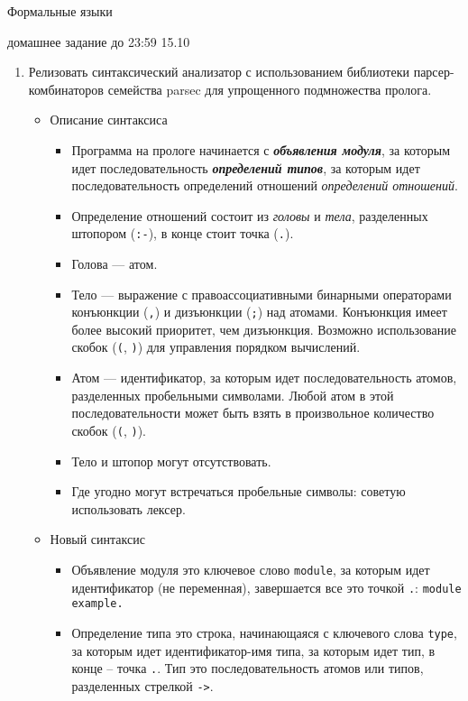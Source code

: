 \documentclass[12pt]{article}
\begin{document}
\begin{center} {\LARGE Формальные языки} \end{center}

\begin{center} \Large домашнее задание до 23:59 15.10 \end{center}
\bigskip

\begin{enumerate}
  \item
  {
    Релизовать синтаксический анализатор с использованием библиотеки парсер-комбинаторов семейства parsec для упрощенного подмножества пролога.
    \begin{itemize}
      \item Описание синтаксиса
      \begin{itemize}
        \item Программа на прологе начинается с \emph{\textbf{объявления модуля}}, за которым идет последовательность \emph{\textbf{определений типов}}, за которым идет последовательность определений отношений \emph{определений отношений}.
        \item Определение отношений состоит из \emph{головы} и \emph{тела}, разделенных штопором (\verb!:-!), в конце стоит точка (\verb!.!).
        \item Голова --- атом.
        \item Тело --- выражение с правоассоциативными бинарными операторами конъюнкции (\verb!,!) и дизъюнкции (\verb!;!) над атомами. Конъюнкция имеет более высокий приоритет, чем дизъюнкция. Возможно использование скобок (\verb!(!, \verb!)!) для управления порядком вычислений.
        \item Атом --- идентификатор, за которым идет последовательность атомов, разделенных пробельными символами. Любой атом в этой последовательности может быть взять в произвольное количество скобок (\verb!(!, \verb!)!).
        \item Тело и штопор могут отсутствовать.
        \item Где угодно могут встречаться пробельные символы: советую использовать лексер.
      \end{itemize}
      \item Новый синтаксис
        \begin{itemize}
          \item Объявление модуля это ключевое слово \verb!module!, за которым идет идентификатор (не переменная), завершается все это точкой \verb!.!: \verb!module example.!
          \item Определение типа это строка, начинающаяся с ключевого слова \verb!type!, за которым идет идентификатор-имя типа, за которым идет тип, в конце -- точка \verb!.!. Тип это последовательность атомов или типов, разделенных стрелкой \verb!->!.

\end{itemize}
\end{itemize}}
\end{enumerate}
\end{document}
